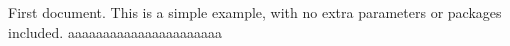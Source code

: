 \documentclass{article}
\begin{document}
First document. This is a simple example, with no 
extra parameters or packages included.
aaaaaaaaaaaaaaaaaaaaaa
\end{document}
